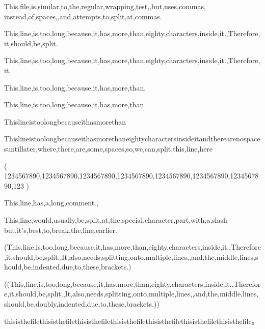 \documentclass{article}
\begin{document}
This,file,is,similar,to,the,regular,wrapping,test,,but,uses,commas,
instead,of,spaces,,and,attempts,to,split,at,commas.

This,line,is,too,long,because,it,has,more,than,eighty,characters,inside,it.,Therefore,it,should,be,split.

This,line,is,too,long,because,it,has,more,than,eighty,characters,inside,it.,Therefore,it,%

This,line,is,too,long,because,it,has,more,than,%

This,line,is,too,long,because,it,has,more,than%

Thislineistoolongbecauseithasmorethan%

Thislineistoolongbecauseithasmorethaneightycharactersinsideitandtherearenospacesuntillater,where,there,are,some,spaces,so,we,can,split,this,line,here

(
  1234567890,1234567890,1234567890,1234567890,1234567890,1234567890,1234567890,123
)

This,line,has,a,long,comment.,%


This,line,would,usually,be,split,at,the,special,character,part,with,a,slash\,but,it's,best,to,break,the,line,earlier.

(This,line,is,too,long,because,it,has,more,than,eighty,characters,inside,it.,Therefore,it,should,be,split.,It,also,needs,splitting,onto,multiple,lines,,and,the,middle,lines,should,be,indented,due,to,these,brackets.)

((This,line,is,too,long,because,it,has,more,than,eighty,characters,inside,it.,Therefore,it,should,be,split.,It,also,needs,splitting,onto,multiple,lines,,and,the,middle,lines,should,be,doubly,indented,due,to,these,brackets.))

thisisthefilethisisthefilethisisthefilethisisthefilethisisthefilethisisthefilethisisthefile。
\end{document}
